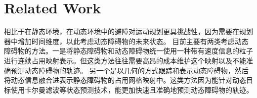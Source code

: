 \documentclass[preprint,5p,times,twocolumn]{elsarticle}
\begin{document}
\section{Related Work}
\label{related_work}
相比于在静态环境，在动态环境中的避障对运动规划更具挑战性，因为需要在规划器中增加时间维度，以此考虑动态障碍物的未来状态。
目前主要有两类考虑动态障碍物的方法。一是将静态障碍物和动态障碍物统一使用一种带有速度信息的粒子进行连续占用映射表示\citep{Guizilini2019DynamicHM, Chen2022ContinuousOM}。但这类方法往往需要高昂的成本维护这个映射以及不能准确预测动态障碍物的轨迹。
另一个是以几何的方式跟踪和表示动态障碍物，然后将动态信息融合进表示静态障碍物的占用网格映射中\citep{Lin2020RobustVO,Xu2022VisionaidedUN}。这类方法因为能针对动态目标使用卡尔曼滤波等状态预测技术，能更加快速且准确地预测动态障碍物的轨迹。
\end{document}
